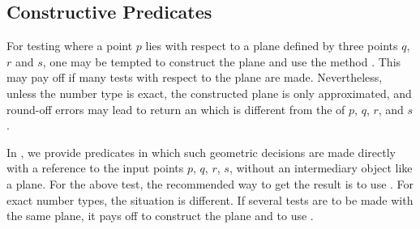 \subsection{Constructive Predicates}
For testing where a point $p$ lies with respect to a plane defined by three
points $q$, $r$ and $s$, one may be tempted to construct the plane
 and use the method . 
This may pay off if many tests with respect to the plane are made. 
Nevertheless, unless the number type is exact, the constructed plane 
is only approximated, and round-off errors may lead 
 to return an  
which is different from the  of $p$, $q$, $r$, 
and $s$.

In {\cgal}, we provide predicates in which such
geometric decisions are made directly with a reference to the input points
$p$, $q$, $r$, $s$, without an intermediary object like a plane. 
For the above test, the recommended way to get the result is to use
. For exact number types, the situation is different.
If several tests are to be made with the same
plane, it pays off to construct the plane and to use .

